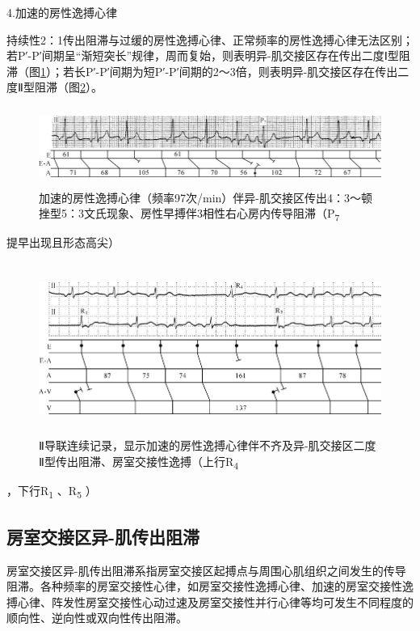 4.加速的房性逸搏心律

持续性2：1传出阻滞与过缓的房性逸搏心律、正常频率的房性逸搏心律无法区别；若P′-P′间期呈“渐短突长”规律，周而复始，则表明异-肌交接区存在传出二度Ⅰ型阻滞（图\ref{fig23-4}）；若长P′-P′间期为短P′-P′间期的2～3倍，则表明异-肌交接区存在传出二度Ⅱ型阻滞（图\ref{fig23-5}）。

\begin{figure}[!htbp]
 \centering
 \includegraphics[width=5.78125in,height=1.02083in]{./images/Image00388.jpg}
 \captionsetup{justification=centering}
 \caption{加速的房性逸搏心律（频率97次/min）伴异-肌交接区传出4：3～顿挫型5：3文氏现象、房性早搏伴3相性右心房内传导阻滞（P\textsubscript{7}}
 \label{fig23-4}
  \end{figure} 
提早出现且形态高尖）

\begin{figure}[!htbp]
 \centering
 \includegraphics[width=5.75in,height=2.21875in]{./images/Image00389.jpg}
 \captionsetup{justification=centering}
 \caption{Ⅱ导联连续记录，显示加速的房性逸搏心律伴不齐及异-肌交接区二度Ⅱ型传出阻滞、房室交接性逸搏（上行R\textsubscript{4}}
 \label{fig23-5}
  \end{figure} 
，下行R\textsubscript{1} 、R\textsubscript{5} ）

\protect\hypertarget{text00030.htmlux5cux23subid362}{}{}

\subsection{房室交接区异-肌传出阻滞}

房室交接区异-肌传出阻滞系指房室交接区起搏点与周围心肌组织之间发生的传导阻滞。各种频率的房室交接性心律，如房室交接性逸搏心律、加速的房室交接性逸搏心律、阵发性房室交接性心动过速及房室交接性并行心律等均可发生不同程度的顺向性、逆向性或双向性传出阻滞。

